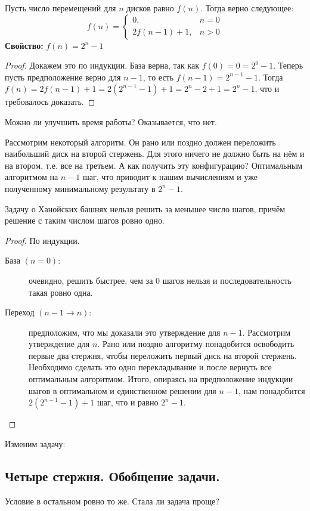 Пусть число перемещений для $n$ дисков равно $f(n)$. Тогда верно следующее: \[f(n) = \begin{cases}0, &n=0\\2f(n-1)+1, &n>0\end{cases}\]
\textbf{Свойство:} \textit{$f(n) = 2^n - 1$}
\begin{proof} Докажем это по индукции. База верна, так как $f(0) = 0 = 2^0 - 1$. Теперь пусть предположение верно для $n - 1$, то есть $f(n - 1) = 2^{n - 1} - 1$. Тогда $f(n) = 2f(n - 1) + 1 = 2(2^{n - 1} - 1) + 1 = 2^n - 2 + 1 = 2^n - 1$, что и требовалось доказать. \end{proof}

Можно ли улучшить время работы? Оказывается, что нет.

Рассмотрим некоторый алгоритм. Он рано или поздно должен переложить наибольший диск на второй стержень. Для этого ничего не должно быть на нём и на втором, т.е. все на третьем. А как получить эту конфигурацию? Оптимальным алгоритмом на $n-1$ шаг, что приводит к нашим вычислениям и уже полученному минимальному результату в $2^n-1$.

\begin{minimal_steps}
Задачу о Ханойских башнях нельзя решить за меньшее число шагов, причём решение с таким числом шагов ровно одно.
\end{minimal_steps}
\begin{proof}
По индукции.
\begin{description}
\item[База $(n = 0)$:] очевидно, решить быстрее, чем за 0 шагов нельзя и последовательность такая ровно одна.

\item[Переход $(n - 1 \to n)$:] предположим, что мы доказали это утверждение для $n-1$. Рассмотрим утверждение для $n$. Рано или поздно алгоритму понадобится освободить первые два стержня, чтобы переложить первый диск на второй стержень. Необходимо сделать это одно перекладывание и после вернуть все оптимальным алгоритмом. Итого, опираясь на предположение индукции шагов в оптимальном и единственном решении для $n-1$, нам понадобится $2(2^{n-1} - 1) + 1$ шаг, что и равно $2^n -1$. \qedhere
\end{description}
\end{proof}

Изменим задачу:
\subsection*{Четыре стержня. Обобщение задачи.}
Условие в остальном ровно то же. 
Стала ли задача проще?

